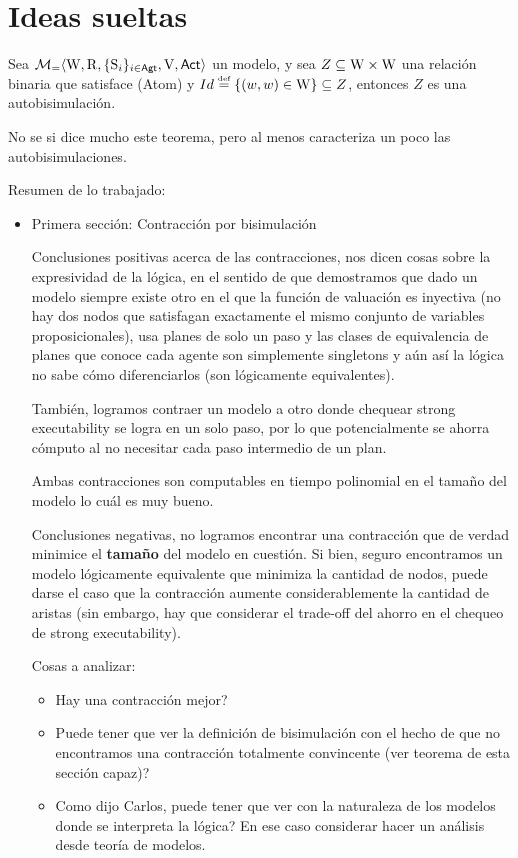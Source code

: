 \chapter{Ideas sueltas}

\begin{teorema}
    Sea $\mathcal{M}_=\langle \mathrm{W},\mathrm{R},\{ \mathrm{S}_i \}_{i \in {\rm \sf Agt}},\mathrm{V},{\rm \sf Act} \rangle$ un modelo, y sea $Z \subseteq \mathrm{W} \times \mathrm{W}$ una relación binaria que satisface (Atom) y $Id \eqdef \{(w,w)\in \W\} \subseteq Z$, entonces $Z$ es una autobisimulación.
\end{teorema}

No se si dice mucho este teorema, pero al menos caracteriza un poco las autobisimulaciones.

Resumen de lo trabajado:

\begin{itemize}

\item Primera sección: Contracción por bisimulación

Conclusiones positivas acerca de las contracciones, nos dicen cosas sobre la expresividad de la lógica, en el sentido de que demostramos que dado un modelo siempre existe otro en el que la función de valuación es inyectiva (no hay dos nodos que satisfagan exactamente el mismo conjunto de variables proposicionales), usa planes de solo un paso y las clases de equivalencia de planes que conoce cada agente son simplemente singletons y aún así la lógica no sabe cómo diferenciarlos (son lógicamente equivalentes).

También, logramos contraer un modelo a otro donde chequear strong executability se logra en un solo paso, por lo que potencialmente se ahorra cómputo al no necesitar cada paso intermedio de un plan.

Ambas contracciones son computables en tiempo polinomial en el tamaño del modelo lo cuál es muy bueno.


Conclusiones negativas, no logramos encontrar una contracción que de verdad minimice el \rm\textbf{tamaño} del modelo en cuestión. Si bien, seguro encontramos un modelo lógicamente equivalente que minimiza la cantidad de nodos, puede darse el caso que la contracción aumente considerablemente la cantidad de aristas (sin embargo, hay que considerar el trade-off del ahorro en el chequeo de strong executability).

Cosas a analizar: 
\begin{itemize}
    \item Hay una contracción mejor?
    \item Puede tener que ver la definición de bisimulación con el hecho de que no encontramos una contracción totalmente convincente (ver teorema de esta sección capaz)? 
    \item Como dijo Carlos, puede tener que ver con la naturaleza de los modelos donde se interpreta la lógica? En ese caso considerar hacer un análisis desde teoría de modelos.
\end{itemize}



\end{itemize}

